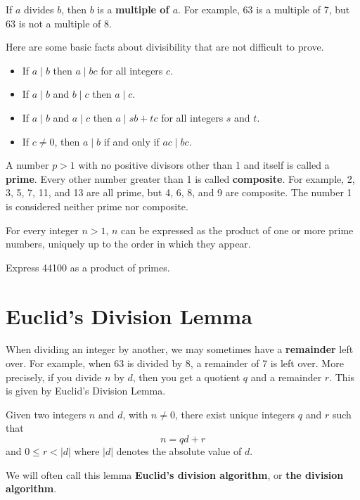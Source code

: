 If $a$ divides $b$, then $b$ is a \textbf{multiple of $a$}. For example, 63 is a multiple of 7, but 63 is not a multiple of 8.

Here are some basic facts about divisibility that are not difficult to prove.
\begin{itemize}
    \item If $a\;|\;b$ then $a\;|\;bc$ for all integers $c$.
    \item If $a\;|\;b$ and $b\;|\;c$ then $a\;|\;c$.
    \item If $a\;|\;b$ and $a\;|\;c$ then $a\;|\;sb+tc$ for all integers $s$ and $t$.
    \item If $c \neq 0$, then $a\;|\;b$ if and only if $ac\;|\;bc$.
\end{itemize}

A number $p > 1$ with no positive divisors other than 1 and itself is called a \textbf{prime}. Every other number greater than 1 is called \textbf{composite}. For example, 2, 3, 5, 7, 11, and 13 are all prime, but 4, 6, 8, and 9 are composite. The number 1 is considered neither prime nor composite.

\begin{theorem}\label{thrm-fundamental-theorem-of-arithmetic}
    For every integer $n > 1$, $n$ can be expressed as the product of one or more prime numbers, uniquely up to the order in which they appear.
\end{theorem}

\begin{exercise}
    Express 44100 as a product of primes.
\end{exercise}

\section{Euclid's Division Lemma}
When dividing an integer by another, we may sometimes have a \textbf{remainder} left over. For example, when 63 is divided by 8, a remainder of 7 is left over. More precisely, if you divide $n$ by $d$, then you get a quotient $q$ and a remainder $r$. This is given by Euclid's Division Lemma.
\begin{lemma}
    Given two integers $n$ and $d$, with $n \neq 0$, there exist unique integers $q$ and $r$ such that
    \[
        n = qd + r
    \]
    and $0 \leq r < |d|$ where $|d|$ denotes the absolute value of $d$.
\end{lemma}
\begin{remark}
    We will often call this lemma \textbf{Euclid's division algorithm}, or \textbf{the division algorithm}.
\end{remark}

